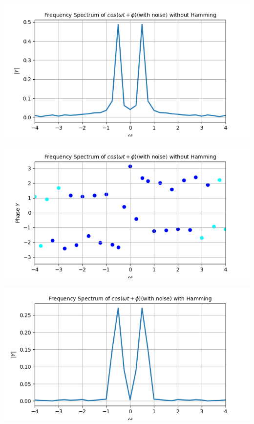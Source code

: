 \documentclass[12pt, a4paper]{report}
\begin{document}
\clearpage
\begin{center}
	\includegraphics[scale=0.8]{Figure_18.png} 
	\label{fig:rawdata}
\end{center}
\begin{center}
	\includegraphics[scale=0.8]{Figure_19.png} 
	\label{fig:rawdata}
\end{center}
\begin{center}
	\includegraphics[scale=0.8]{Figure_20.png} 
	\label{fig:rawdata}
\end{center}
\clearpage
\end{document}
